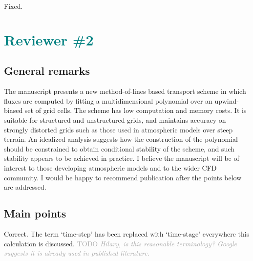 \documentclass[times]{elsarticle}
\newcommand{\TODO}[1]{\textcolor{darkgray}{TODO \textit{#1}}}
\newcommand{\revtwo}[1]{\textcolor{teal}{\textbf{#1}}}
\begin{document}
\begin{quotation}
\begin{comment}
\item p. 18, last but one paragraph, last sentence: correct "imprintingin".
\end{comment}
\end{quotation}
Fixed.


\section*{\revtwo{Reviewer \#2}}

\subsection*{General remarks}

The manuscript presents a new method-of-lines based transport scheme
in which fluxes are computed by fitting a multidimensional
polynomial over an upwind-biased set of grid cells. The scheme
has low computation and memory costs. It is suitable for
structured and unstructured grids, and maintains accuracy
on strongly distorted grids such as those used in atmospheric models
over steep terrain. An idealized analysis suggests how the
construction of the polynomial should be constrained to obtain
conditional stability of the scheme, and such stability appears
to be achieved in practice.
I believe the manuscript will be of interest to those developing
atmospheric models and to the wider CFD community. I would be happy to
recommend publication after the points below are addressed.


\subsection*{Main points}

\begin{quotation}
\begin{comment}
\setcounter{commenti}{0}
\item It is claimed (in several places) that the scheme requires `just one
vector multiply per face per time step'. Since the two-stage Heun scheme
(2) is used, surely the cost must be two vector multiplies per face per time
step (or, more generally, one vector multiply per face per {\it stage})?
\end{comment}
\end{quotation}
Correct.  The term `time-step' has been replaced with `time-stage' everywhere this calculation is discussed.  \TODO{Hilary, is this reasonable terminology?  Google suggests it is already used in published literature.}
\end{document}
